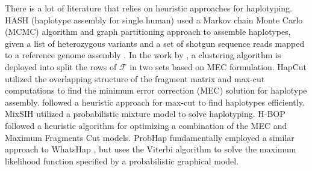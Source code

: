 There is a lot of literature that relies on heuristic approaches for haplotyping.
HASH (haplotype assembly for single human) used a Markov chain Monte Carlo (MCMC) algorithm and graph partitioning approach to assemble haplotypes,
given a list of heterozygous variants and a set of shotgun sequence reads mapped to a reference genome assembly \citep{bansal2008mcmc}. 
In the work by \cite{wang2007clustering}, a clustering algorithm is deployed into split the rows of $\mathcal{F}$ in two sets based on MEC formulation.
HapCut \citep{Bansal2008} utilized the overlapping structure of the fragment matrix and max-cut computations to find the minimum error correction (MEC) solution for haplotype assembly. 
\cite{Duitama2010} followed a heuristic approach for max-cut to find haplotypes efficiently. 
MixSIH \citep{matsumoto2013mixsih} utilized a probabilistic mixture model to solve haplotyping.
H-BOP \citep{xie2012fast} followed a heuristic algorithm for optimizing a combination of the MEC and Maximum Fragments Cut models.
ProbHap \citep{Kuleshov2014b} fundamentally employed a similar approach to WhatsHap \citep{Patterson2015}, but uses the Viterbi algorithm to solve the maximum likelihood function specified by a probabilistic graphical model. 
